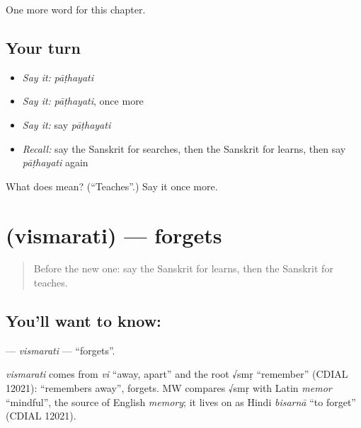 \begin{grammarlens}[title={What you've built}]
One more word for this chapter.
\end{grammarlens}

\subsection*{Your turn}
\begin{itemize}
\raggedright
  \item \emph{Say it:} \emph{pāṭhayati}
  \item \emph{Say it:} \emph{pāṭhayati}, once more
  \item \emph{Say it:} say \emph{pāṭhayati}
  \item \emph{Recall:} say the Sanskrit for searches, then the Sanskrit for learns, then say \emph{pāṭhayati} again
\end{itemize}

\begin{tcolorbox}[breakable,colback=teal!4,colframe=teal!35!black,title={Before you move on}]
What does  mean? (\textquotedblleft{}Teaches\textquotedblright{}.) Say it once more.
\end{tcolorbox}
\section[\texorpdfstring{\sk{विस्मरति} (vismarati)}{विस्मरति (vismarati)}]{ (vismarati) — forgets}

\label{lesson:SA-C135-vismarati}



\begin{quote}
Before the new one: say the Sanskrit for learns, then the Sanskrit for teaches.
\end{quote}

\subsection*{You'll want to know: }
\textbf{} — \emph{vismarati} — \textquotedblleft{}forgets\textquotedblright{}.

\begin{cousinweb}
\emph{vismarati} comes from \emph{vi} \textquotedblleft{}away, apart\textquotedblright{} and the root √smṛ \textquotedblleft{}remember\textquotedblright{} (CDIAL 12021): \textquotedblleft{}remembers away\textquotedblright{}, forgets. MW compares √smṛ with Latin \emph{memor} \textquotedblleft{}mindful\textquotedblright{}, the source of English \emph{memory}; it lives on as Hindi \emph{bisarnā} \textquotedblleft{}to forget\textquotedblright{} (CDIAL 12021).
\end{cousinweb}

